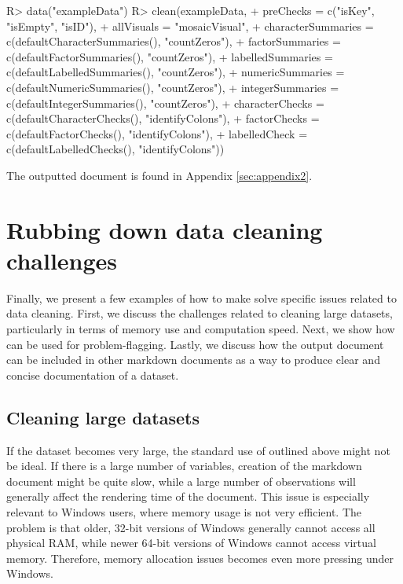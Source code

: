 \documentclass[article,shortnames]{jss}
\newcommand{\hl}[1]{\textcolor{magenta}{#1}}
\begin{document}
\begin{Schunk}
\begin{Sinput}
R> data("exampleData")
R> clean(exampleData,
+    preChecks = c("isKey", "isEmpty", "isID"),
+    allVisuals = "mosaicVisual",
+    characterSummaries = c(defaultCharacterSummaries(), "countZeros"),
+    factorSummaries = c(defaultFactorSummaries(), "countZeros"),
+    labelledSummaries = c(defaultLabelledSummaries(), "countZeros"),
+    numericSummaries = c(defaultNumericSummaries(), "countZeros"),
+    integerSummaries = c(defaultIntegerSummaries(), "countZeros"),
+    characterChecks = c(defaultCharacterChecks(), "identifyColons"),
+    factorChecks = c(defaultFactorChecks(), "identifyColons"),
+    labelledCheck = c(defaultLabelledChecks(), "identifyColons"))
\end{Sinput}
\end{Schunk}

The outputted document is found in Appendix \ref{sec:appendix2}.

\section{Rubbing down data cleaning challenges}
\label{sec:specificExamples}

Finally, we present a few examples of how to make 
solve specific issues related to data cleaning. First, we discuss the
challenges related to cleaning large datasets, particularly in terms
of memory use and computation speed. Next, we show how 
can be used for problem-flagging. Lastly, we discuss how the
 output document can be included in other  markdown
documents as a way to produce clear and concise documentation of a
dataset. %

\subsection{Cleaning large datasets}
If the dataset becomes very large, the standard use of 
outlined above might not be ideal. If there is a large number of
variables, creation of the  markdown document might be quite
slow, while a large number of observations will generally affect the
rendering time of the document. This issue is especially relevant to
Windows users, where memory usage is not very efficient. The problem is that older,
32-bit versions of Windows generally cannot access all physical RAM,
while newer 64-bit versions of Windows cannot access virtual memory. Therefore,
memory allocation issues becomes even more pressing under Windows.
\end{document}
